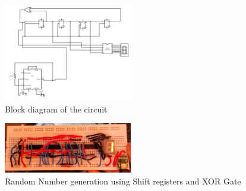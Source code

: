 \documentclass[12pt,onecolumn,notitlepage]{article}
\begin{document}
\begin{figure}[h!]
  \centering
  \includegraphics[width=0.5\textwidth]{blockdiag.jpg}
  \caption{Block diagram of the circuit}
  \label{fig:Circuit}
\end{figure}

\begin{figure}[h!]
  \centering
  \includegraphics[width=0.5\textwidth]{circuit.jpg}
  \caption{Random Number generation using Shift registers and XOR Gate}
  \label{fig:Circuit}
\end{figure}

 
\end{document}

